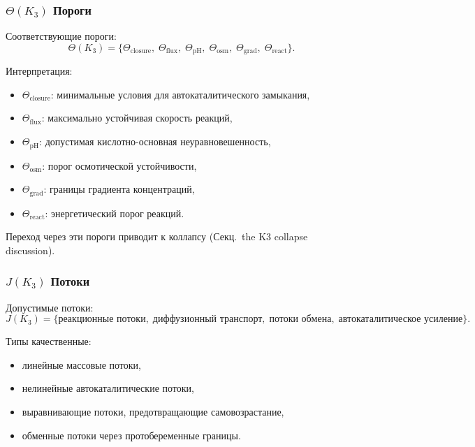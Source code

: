 \subsubsection{\texorpdfstring{$\Theta(K_3)$}{\Theta(K_3)} Пороги}

Соответствующие пороги:
\[
\Theta(K_3) =
\{\Theta_{\mathrm{closure}},\;
  \Theta_{\mathrm{flux}},\;
  \Theta_{\mathrm{pH}},\;
  \Theta_{\mathrm{osm}},\;
  \Theta_{\mathrm{grad}},\;
  \Theta_{\mathrm{react}}\}.
\]

Интерпретация:
\begin{itemize}
    \item $\Theta_{\mathrm{closure}}$: минимальные условия для
          автокаталитического замыкания,
    \item $\Theta_{\mathrm{flux}}$: максимально устойчивая скорость реакций,
    \item $\Theta_{\mathrm{pH}}$: допустимая кислотно-основная
          неуравновешенность,
    \item $\Theta_{\mathrm{osm}}$: порог осмотической устойчивости,
    \item $\Theta_{\mathrm{grad}}$: границы градиента концентраций,
    \item $\Theta_{\mathrm{react}}$: энергетический порог реакций.
\end{itemize}

Переход через эти пороги приводит к коллапсу (Секц.~the K3 collapse discussion).

\subsubsection{\texorpdfstring{$J(K_3)$}{J(K_3)} Потоки}

Допустимые потоки:
\[
J(K_3) = \{\text{реакционные потоки},\; \text{диффузионный транспорт},\;
         \text{потоки обмена},\; \text{автокаталитическое усиление}\}.
\]

Типы качественные:
\begin{itemize}
    \item линейные массовые потоки,
    \item нелинейные автокаталитические потоки,
    \item выравнивающие потоки, предотвращающие самовозрастание,
    \item обменные потоки через протобеременные границы.
\end{itemize}


